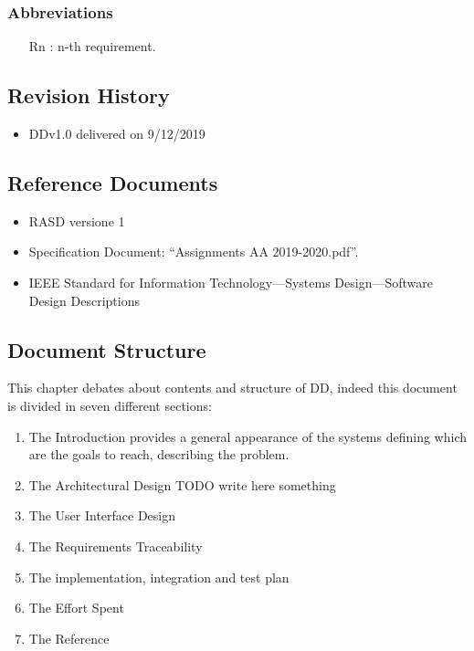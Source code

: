 	\subsubsection {Abbreviations}
\begin{itemize}
\item	[Rn]: n-th requirement.
\end{itemize}
\subsection {Revision History}
\begin{itemize}
\item	DDv1.0 delivered on 9/12/2019
\end{itemize}
\subsection {Reference Documents}
\begin{itemize}
\item 	RASD versione 1
\item	Specification Document: “Assignments AA 2019-2020.pdf”.
\item	IEEE Standard for Information Technology—Systems Design—Software Design Descriptions
\end{itemize}
\subsection{Document Structure}
This chapter debates about contents and structure of DD, indeed this document is divided in seven different sections:
\begin{enumerate}
\item	The Introduction provides a general appearance of the systems defining which are the goals to reach, describing the problem.
\item The Architectural Design TODO write here something
\item The User Interface Design
\item The Requirements Traceability
\item The implementation, integration and test plan
\item The Effort Spent
\item The Reference
\end{enumerate}

